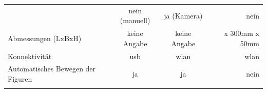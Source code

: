 \begin{longtable}[]{@{}lccr@{}}
\begin{minipage}[t]{0.19\columnwidth}
\end{minipage} & \begin{minipage}[t]{0.25\columnwidth}\centering
nein (manuell)\strut
\end{minipage} & \begin{minipage}[t]{0.26\columnwidth}\centering
ja (Kamera)\strut
\end{minipage} & \begin{minipage}[t]{0.19\columnwidth}\raggedleft
nein\strut
\end{minipage}\tabularnewline
\begin{minipage}[t]{0.19\columnwidth}\raggedright
Abmessungen (LxBxH)\strut
\end{minipage} & \begin{minipage}[t]{0.25\columnwidth}\centering
keine Angabe\strut
\end{minipage} & \begin{minipage}[t]{0.26\columnwidth}\centering
keine Angabe\strut
\end{minipage} & \begin{minipage}[t]{0.19\columnwidth}\raggedleft
450mm x 300mm x 50mm\strut
\end{minipage}\tabularnewline
\begin{minipage}[t]{0.19\columnwidth}\raggedright
Konnektivität\strut
\end{minipage} & \begin{minipage}[t]{0.25\columnwidth}\centering
\gls{usb}\strut
\end{minipage} & \begin{minipage}[t]{0.26\columnwidth}\centering
\gls{wlan}\strut
\end{minipage} & \begin{minipage}[t]{0.19\columnwidth}\raggedleft
\gls{wlan}\strut
\end{minipage}\tabularnewline
\begin{minipage}[t]{0.19\columnwidth}\raggedright
Automatisches Bewegen der Figuren\strut
\end{minipage} & \begin{minipage}[t]{0.25\columnwidth}\centering
ja\strut
\end{minipage} & \begin{minipage}[t]{0.26\columnwidth}\centering
ja\strut
\end{minipage} & \begin{minipage}[t]{0.19\columnwidth}\raggedleft
nein\strut
\end{minipage}\tabularnewline
\begin{minipage}[t]{0.19\columnwidth}\raggedright

\end{minipage}
\end{longtable}
